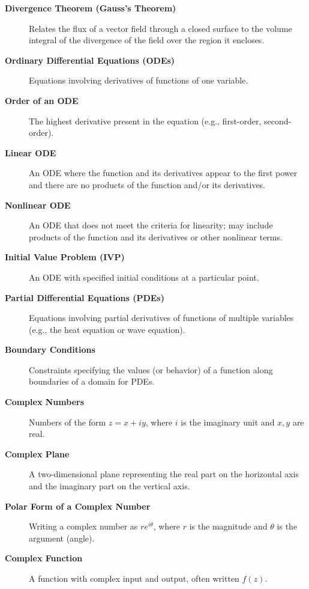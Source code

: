 \begin{description}
  \item[\textbf{Divergence Theorem (Gauss's Theorem)}] Relates the flux of a vector field through a closed surface to the volume integral of the divergence of the field over the region it encloses.

  \item[\textbf{Ordinary Differential Equations (ODEs)}] Equations involving derivatives of functions of one variable.

  \item[\textbf{Order of an ODE}] The highest derivative present in the equation (e.g., first-order, second-order).

  \item[\textbf{Linear ODE}] An ODE where the function and its derivatives appear to the first power and there are no products of the function and/or its derivatives.

  \item[\textbf{Nonlinear ODE}] An ODE that does not meet the criteria for linearity; may include products of the function and its derivatives or other nonlinear terms.

  \item[\textbf{Initial Value Problem (IVP)}] An ODE with specified initial conditions at a particular point.

  \item[\textbf{Partial Differential Equations (PDEs)}] Equations involving partial derivatives of functions of multiple variables (e.g., the heat equation or wave equation).

  \item[\textbf{Boundary Conditions}] Constraints specifying the values (or behavior) of a function along boundaries of a domain for PDEs.

  \item[\textbf{Complex Numbers}] Numbers of the form $z = x + iy$, where $i$ is the imaginary unit and $x,y$ are real.

  \item[\textbf{Complex Plane}] A two-dimensional plane representing the real part on the horizontal axis and the imaginary part on the vertical axis.

  \item[\textbf{Polar Form of a Complex Number}] Writing a complex number as $re^{i\theta}$, where $r$ is the magnitude and $\theta$ is the argument (angle).

  \item[\textbf{Complex Function}] A function with complex input and output, often written $f(z)$.


\end{description}
